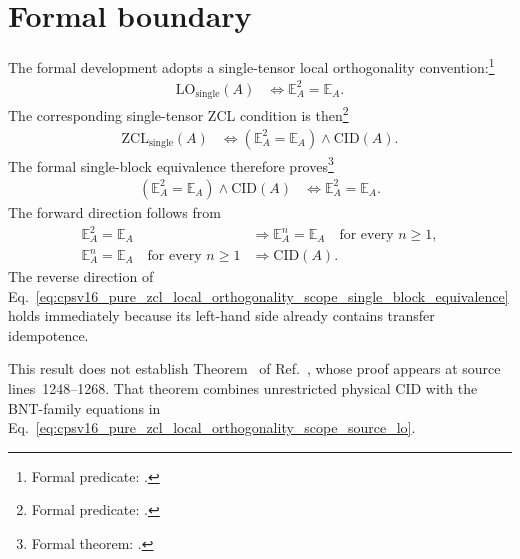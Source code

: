 \documentclass{article}
\begin{document}
\section{Formal boundary}

The formal development adopts a single-tensor local orthogonality
convention:\footnote{Formal predicate: .}
\begin{align}
    \mathrm{LO}_{\mathrm{single}}(A)
        &\Longleftrightarrow \mathbb E_A^2=\mathbb E_A.
    \label{eq:cpsv16_pure_zcl_local_orthogonality_scope_formal_local_orthogonality}
\end{align}
The corresponding single-tensor ZCL condition is then\footnote{Formal
predicate: .}
\begin{align}
    \mathrm{ZCL}_{\mathrm{single}}(A)
        &\Longleftrightarrow
        (\mathbb E_A^2=\mathbb E_A)\wedge\mathrm{CID}(A).
    \label{eq:cpsv16_pure_zcl_local_orthogonality_scope_formal_zcl}
\end{align}
The formal single-block equivalence therefore proves\footnote{Formal theorem:
.}
\begin{align}
    (\mathbb E_A^2=\mathbb E_A)\wedge\mathrm{CID}(A)
        &\Longleftrightarrow \mathbb E_A^2=\mathbb E_A.
    \label{eq:cpsv16_pure_zcl_local_orthogonality_scope_single_block_equivalence}
\end{align}
The forward direction follows from
\begin{align}
    \mathbb E_A^2=\mathbb E_A
        &\Longrightarrow \mathbb E_A^n=\mathbb E_A
        \quad\text{for every }n\geq 1,
    \label{eq:cpsv16_pure_zcl_local_orthogonality_scope_positive_power_idempotence}\\
    \mathbb E_A^n=\mathbb E_A
        \quad\text{for every }n\geq 1
        &\Longrightarrow \mathrm{CID}(A).
    \label{eq:cpsv16_pure_zcl_local_orthogonality_scope_idempotence_implies_cid}
\end{align}
The reverse direction of
Eq.~\ref{eq:cpsv16_pure_zcl_local_orthogonality_scope_single_block_equivalence}
holds immediately because its left-hand side already contains transfer
idempotence.

This result does not establish Theorem~ of
Ref.~\cite{Cirac2016MPDO_arXiv}, whose proof appears at source
lines~1248--1268. That theorem combines unrestricted physical CID with the
BNT-family equations in
Eq.~\ref{eq:cpsv16_pure_zcl_local_orthogonality_scope_source_lo}.
\end{document}
